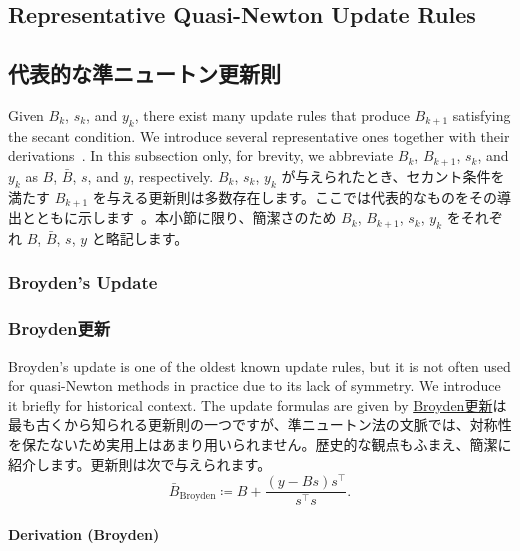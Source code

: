 \documentclass[0_main]{subfiles}
\begin{document}
\ifEn
    \subsection{Representative Quasi-Newton Update Rules}
\else
    \subsection{代表的な準ニュートン更新則}
\fi

\ifEn
    Given $B_k$, $s_k$, and $y_k$, there exist many update rules that produce $B_{k+1}$ satisfying the secant condition. We introduce several representative ones together with their derivations~\citep{dennisjrQuasiNewtonMethodsMotivation1977}. In this subsection only, for brevity, we abbreviate $B_k$, $B_{k+1}$, $s_k$, and $y_k$ as $B$, $\bar{B}$, $s$, and $y$, respectively.
\else
    $B_k$, $s_k$, $y_k$ が与えられたとき、セカント条件を満たす $B_{k+1}$ を与える更新則は多数存在します。ここでは代表的なものをその導出とともに示します~\citep{dennisjrQuasiNewtonMethodsMotivation1977}。本小節に限り、簡潔さのため $B_k$, $B_{k+1}$, $s_k$, $y_k$ をそれぞれ $B$, $\bar{B}$, $s$, $y$ と略記します。
\fi

\ifEn
    \subsubsection{Broyden's Update}
\else
    \subsubsection{Broyden更新}
\fi

\ifEn
    Broyden's update is one of the oldest known update rules, but it is not often used for quasi-Newton methods in practice due to its lack of symmetry. We introduce it briefly for historical context. The update formulas are given by
\else
    \href{https://en.wikipedia.org/wiki/Broyden%27s_method}{Broyden更新}は最も古くから知られる更新則の一つですが、準ニュートン法の文脈では、対称性を保たないため実用上はあまり用いられません。歴史的な観点もふまえ、簡潔に紹介します。更新則は次で与えられます。
\fi
\begin{equation*}
    \bar{B}_{\mathrm{Broyden}} \coloneqq B + \frac{(y - Bs)s^\top}{s^\top s}.
\end{equation*}

\ifEn
    \paragraph{Derivation (Broyden)}
\else
\end{document}
